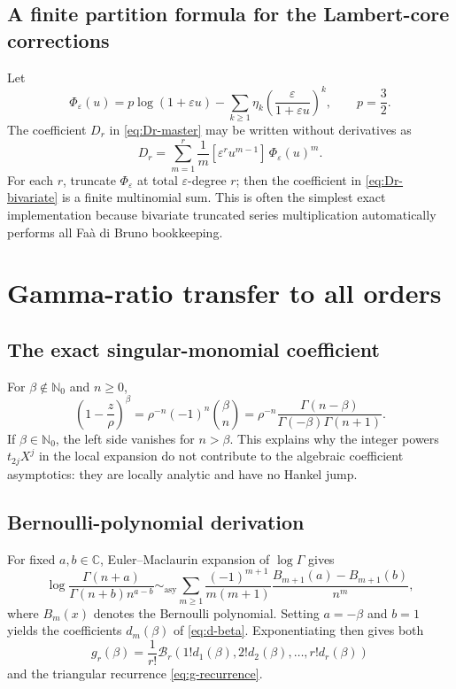 \documentclass[11pt,a4paper,oneside,openany]{book}
\theoremstyle{definition}
\theoremstyle{remark}
\newcommand{\N}{\mathbb N}
\newcommand{\C}{\mathbb C}
\newcommand{\Bell}[1]{\mathcal B_{#1}}
\newcommand{\asympseries}{\sim_{\!\mathrm{asy}}}
\begin{document}
\section{A finite partition formula for the Lambert-core corrections}
Let
\begin{equation}
 \Phi_\varepsilon(u)=
 p\log(1+\varepsilon u)
 -\sum_{k\ge1}\eta_k
  \left(\frac{\varepsilon}{1+\varepsilon u}\right)^k,
 \qquad p=\frac32.
 \label{eq:Phi-eps-appendix}
\end{equation}
The coefficient $D_r$ in \cref{eq:Dr-master} may be written without derivatives
as
\begin{equation}
 \boxed{
 D_r=\sum_{m=1}^{r}\frac1m
 [\varepsilon^ru^{m-1}]\,\Phi_\varepsilon(u)^m.}
 \label{eq:Dr-bivariate}
\end{equation}
For each $r$, truncate $\Phi_\varepsilon$ at total $\varepsilon$-degree $r$;
then the coefficient in \cref{eq:Dr-bivariate} is a finite multinomial sum.
This is often the simplest exact implementation because bivariate truncated
series multiplication automatically performs all Fa\`a di Bruno bookkeeping.

\chapter{Gamma-ratio transfer to all orders}
\label{app:gamma-transfer}

\section{The exact singular-monomial coefficient}
For $\beta\notin\N_0$ and $n\ge0$,
\begin{equation}
 [z^n]\left(1-\frac z\rho\right)^\beta
 =\rho^{-n}(-1)^n\binom\beta n
 =\rho^{-n}\frac{\Gamma(n-\beta)}
 {\Gamma(-\beta)\Gamma(n+1)}.
 \label{eq:exact-transfer-appendix}
\end{equation}
If $\beta\in\N_0$, the left side vanishes for $n>\beta$.  This explains why the
integer powers $t_{2j}X^j$ in the local expansion do not contribute to the
algebraic coefficient asymptotics: they are locally analytic and have no
Hankel jump.

\section{Bernoulli-polynomial derivation}
For fixed $a,b\in\C$, Euler--Maclaurin expansion of $\log\Gamma$ gives
\begin{equation}
 \log\frac{\Gamma(n+a)}{\Gamma(n+b)n^{a-b}}
 \asympseries
 \sum_{m\ge1}\frac{(-1)^{m+1}}
 {m(m+1)}\frac{B_{m+1}(a)-B_{m+1}(b)}{n^m},
 \label{eq:log-gamma-ratio-general}
\end{equation}
where $B_m(x)$ denotes the Bernoulli polynomial.  Setting $a=-\beta$ and
$b=1$ yields the coefficients $d_m(\beta)$ of \cref{eq:d-beta}.  Exponentiating
then gives both
\begin{equation}
 g_r(\beta)=\frac1{r!}
 \Bell r(1!d_1(\beta),2!d_2(\beta),\ldots,r!d_r(\beta))
 \label{eq:g-bell-appendix}
\end{equation}
and the triangular recurrence \cref{eq:g-recurrence}.
\end{document}
